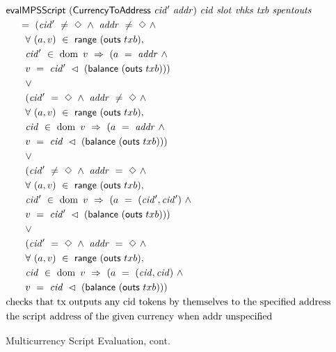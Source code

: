 \begin{figure*}[htb]
  \begin{align*}
    & \mathsf{evalMPSScript}
     ~(\mathsf{CurrencyToAddress}~\mathit{cid'}~\mathit{addr})~\mathit{cid}~ \mathit{slot}~\mathit{vhks} ~\mathit{txb}~\mathit{spentouts} \\
    &~~~~ =~ (\mathit{cid'}~\neq~\Diamond ~\wedge ~\mathit{addr}~\neq~\Diamond ~\wedge \\
    &~~~~~~ \forall~(a, v)~\in~\mathsf{range}~(\mathsf{outs}~txb),~\\
    &~~~~~~ \mathit{cid'}~\in~\operatorname{dom}~v~\Rightarrow~(a~=~\mathit{addr} ~\wedge~ \\
    &~~~~~~ v~=~\mathit{cid'}~ \lhd~(\mathsf{balance}~(\mathsf{outs}~txb))) \\
    &~~~~~~ \vee \\
    &~~~~~~ (\mathit{cid'}~=~\Diamond ~\wedge~ \mathit{addr}~\neq~\Diamond ~\wedge \\
    &~~~~~~ \forall~(a, v)~\in~\mathsf{range}~(\mathsf{outs}~txb),~\\
    &~~~~~~ \mathit{cid}~\in~\operatorname{dom}~v~\Rightarrow~(a~=~\mathit{addr} ~\wedge~\\
    &~~~~~~ v~=~\mathit{cid}~ \lhd~(\mathsf{balance}~(\mathsf{outs}~txb))) \\
    &~~~~~~ \vee \\
    &~~~~~~ (\mathit{cid'}~\neq~\Diamond ~\wedge~ \mathit{addr}~=~\Diamond ~\wedge \\
    &~~~~~~ \forall~(a, v)~\in~\mathsf{range}~(\mathsf{outs}~txb),~\\
    &~~~~~~ \mathit{cid'}~\in~\operatorname{dom}~v~\Rightarrow~(a~=~\mathit{(cid',cid')} ~\wedge~\\
    &~~~~~~ v~=~\mathit{cid'}~ \lhd~(\mathsf{balance}~(\mathsf{outs}~txb))) \\
    &~~~~~~ \vee \\
    &~~~~~~ (\mathit{cid'}~=~\Diamond ~\wedge~ \mathit{addr}~=~\Diamond ~\wedge \\
    &~~~~~~ \forall~(a, v)~\in~\mathsf{range}~(\mathsf{outs}~txb),~\\
    &~~~~~~ \mathit{cid}~\in~\operatorname{dom}~v~\Rightarrow~(a~=~\mathit{(cid,cid)} ~\wedge~\\
    &~~~~~~ v~=~\mathit{cid}~ \lhd~(\mathsf{balance}~(\mathsf{outs}~txb))) \\
    & \text{checks that tx outputs any cid tokens by themselves to the specified address} \\
    & \text {the script address of the given currency when addr unspecified}
    \end{align*}
    \caption{Multicurrency Script Evaluation, cont.}
    \label{fig:defs:tx-mc-eval-2}
\end{figure*}


